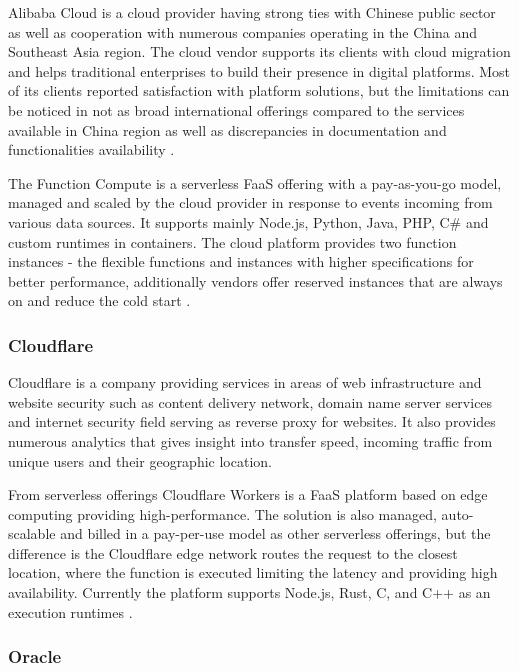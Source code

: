 Alibaba Cloud is a cloud provider having strong ties with Chinese public sector as well as cooperation with numerous companies operating in the China and Southeast Asia region. The cloud vendor supports its clients with cloud migration and helps traditional enterprises to build their presence in digital platforms. Most of its clients reported satisfaction with platform solutions, but the limitations can be noticed in not as broad international offerings compared to the services available in China region as well as discrepancies in documentation and functionalities availability \cite{Gartner}.

The Function Compute is a serverless FaaS offering with a pay-as-you-go model, managed and scaled by the cloud provider in response to events incoming from various data sources. It supports mainly Node.js, Python, Java, PHP, C\# and custom runtimes in containers. The cloud platform provides two function instances - the flexible functions and instances with higher specifications for better performance, additionally vendors offer reserved instances that are always on and reduce the cold start \cite{AlibabaFunctionCompute}.

\subsubsection*{Cloudflare}

Cloudflare is a company providing services in areas of web infrastructure and website security such as content delivery network, domain name server services and internet security field serving as reverse proxy for websites. It also provides numerous analytics that gives insight into transfer speed, incoming traffic from unique users and their geographic location.

From serverless offerings Cloudflare Workers is a FaaS platform based on edge computing providing high-performance. The solution is also managed, auto-scalable and billed in a pay-per-use model as other serverless offerings, but the difference is the Cloudflare edge network routes the request to the closest location, where the function is executed limiting the latency and providing high availability. Currently the platform supports Node.js, Rust, C, and C++ as an execution runtimes \cite{CloudflareWorkers}.

\subsubsection*{Oracle}

